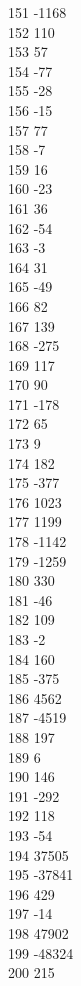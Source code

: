 { 151	-1168 \\
 152	110 \\
 153	57 \\
 154	-77 \\
 155	-28 \\
 156	-15 \\
 157	77 \\
 158	-7 \\
 159	16 \\
 160	-23 \\
 161	36 \\
 162	-54 \\
 163	-3 \\
 164	31 \\
 165	-49 \\
 166	82 \\
 167	139 \\
 168	-275 \\
 169	117 \\
 170	90 \\
 171	-178 \\
 172	65 \\
 173	9 \\
 174	182 \\
 175	-377 \\
 176	1023 \\
 177	1199 \\
 178	-1142 \\
 179	-1259 \\
 180	330 \\
 181	-46 \\
 182	109 \\
 183	-2 \\
 184	160 \\
 185	-375 \\
 186	4562 \\
 187	-4519 \\
 188	197 \\
 189	6 \\
 190	146 \\
 191	-292 \\
 192	118 \\
 193	-54 \\
 194	37505 \\
 195	-37841 \\
 196	429 \\
 197	-14 \\
 198	47902 \\
 199	-48324 \\
 200	215 \\
}
